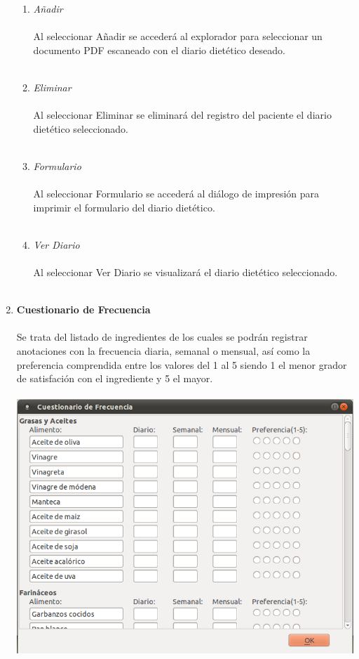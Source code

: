 \documentclass[12pt, spanish]{article}
\begin{document}
\begin{enumerate}
\begin{enumerate}
\item \textit{Añadir}\\\\
Al seleccionar Añadir se accederá al explorador para seleccionar un documento PDF escaneado con el diario dietético deseado.\\\\
\item \textit{Eliminar}\\\\
Al seleccionar Eliminar se eliminará del registro del paciente el diario dietético seleccionado.\\\\
\item \textit{Formulario}\\\\
Al seleccionar Formulario se accederá al diálogo de impresión para imprimir el formulario del diario dietético.\\\\
\item \textit{Ver Diario}\\\\
Al seleccionar Ver Diario se visualizará el diario dietético seleccionado.\\\\
\end{enumerate}
\item \textbf{Cuestionario de Frecuencia}\\\\
Se trata del listado de ingredientes de los cuales se podrán registrar anotaciones con la frecuencia diaria, semanal o mensual, así como la preferencia comprendida entre los valores del 1 al 5 siendo 1 el menor grador de satisfación con el ingrediente y 5 el mayor.\\\\
\includegraphics[scale=0.5]{Image/cuestfrec.png}
\end{enumerate}
\newpage
\end{document}

